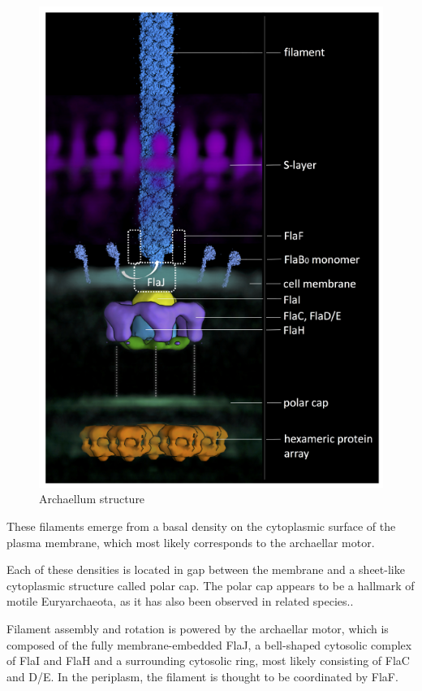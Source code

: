 \documentclass[fontsize=12pt,headsepline=true, bibliography=totocnumbered, twoside]{scrbook} %
\begin{document}
\begin{figure}[]
\center
\includegraphics[scale=0.76]{archaellum}
\caption[Archaellum structure]{Archaellum structure\citep{daum2017structure}}
\end{figure}



These filaments emerge from a basal density on the cytoplasmic surface of the plasma membrane, which most likely corresponds to the archaellar motor.


Each of these densities is located in  gap between the membrane and a sheet-like cytoplasmic structure called polar cap. The polar cap appears to be a hallmark of motile Euryarchaeota, as it has also been observed in related species.. 



Filament assembly and rotation is powered by the archaellar motor, which is composed of the fully membrane-embedded FlaJ, a bell-shaped cytosolic complex of FlaI and FlaH and a surrounding cytosolic ring, most likely consisting of FlaC and D/E. In the periplasm, the filament is thought to be coordinated by FlaF.
\end{document}
